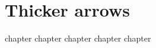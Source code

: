 \part{Thicker arrows}
\label{part:thicker-arrows}
{chapter}
{chapter}
{chapter}
{chapter}
{chapter}

\partended
